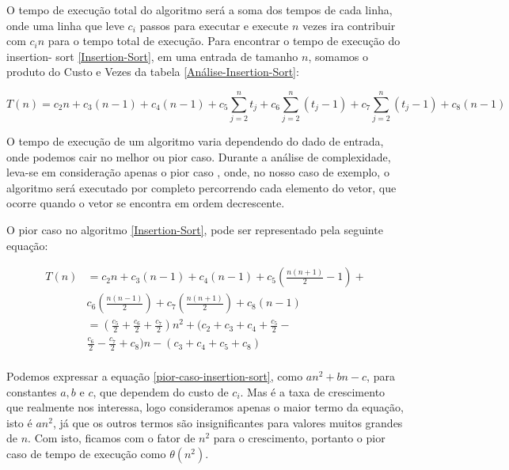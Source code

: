 \documentclass[
    12pt,               %
    openright,          %
    oneside,            %
    a4paper,            %
    english,            %
    brazil              %
    ]{abntex2}
\begin{document}
O tempo de execução total do algoritmo será a soma dos tempos de cada linha, onde uma linha que leve $c_i$ passos para executar
e execute $n$ vezes ira contribuir com $c_in$ para o tempo total de execução. Para encontrar o tempo de execução do insertion-
sort \ref{Insertion-Sort}, em uma entrada de tamanho $n$, somamos o produto do Custo e Vezes da tabela \ref{Análise-Insertion-Sort}:

\begin{equation}
    \label{tempo-execução-insertion-sort}
    T(n) = c_2n + c_3(n - 1) + c_4(n - 1) + c_5\sum_{j=2}^{n} t_j + c_6\sum_{j=2}^{n} (t_j - 1) + c_7\sum_{j=2}^{n} (t_j - 1) + c_8(n-1)
\end{equation}

O tempo de execução de um algoritmo varia dependendo do dado de entrada, onde podemos cair no melhor ou pior caso. Durante a
análise de complexidade, leva-se em consideração apenas o pior caso \cite{introductionAlgorthms}, onde, no nosso caso de exemplo, 
o algoritmo será executado por completo percorrendo cada elemento do vetor, que ocorre quando o vetor se encontra em ordem decrescente.

O pior caso no algoritmo \ref{Insertion-Sort}, pode ser representado pela seguinte equação:

\begin{equation}
    \label{pior-caso-insertion-sort}
    \begin{split}
        T(n)& = c_2n + c_3(n - 1) + c_4(n - 1) + c_5(\frac{n(n+1)}{2}-1) + \\
            &   c_6(\frac{n(n-1)}{2}) + c_7(\frac{n(n+1)}{2}) + c_8(n-1) \\
            & = (\frac{c_5}{2} + \frac{c_6}{2} + \frac{c_7}{2})n^2 + (c_2 + c_3 + c_4 + \frac{c_5}{2} - \\
            &   \frac{c_6}{2} - \frac{c_7}{2} + c_8)n - (c_3 + c_4 + c_5 + c_8) \\
    \end{split}
\end{equation}

Podemos expressar a equação \ref{pior-caso-insertion-sort}, como $an^2 + bn - c$, para constantes $a, b$ e $c$, que dependem do custo de
$c_i$. Mas é a taxa de crescimento que realmente nos interessa, logo consideramos apenas o maior termo da equação, isto é $an^2$, já que
os outros termos são insignificantes para valores muitos grandes de $n$. Com isto, ficamos com o fator de $n^2$ para o crescimento, portanto
o pior caso de tempo de execução como $\theta(n^2)$.
\end{document}
